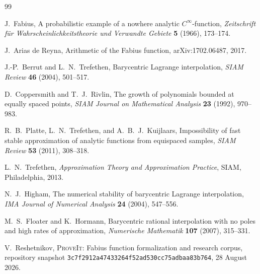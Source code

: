 \documentclass[11pt,oneside]{article}
\numberwithin{equation}{section}
\theoremstyle{definition}
\theoremstyle{remark}
\newcommand{\repo}{\textsc{ProveIt}}
\begin{document}
\begin{thebibliography}{99}

J.~Fabius,
\newblock A probabilistic example of a nowhere analytic $C^\infty$-function,
\newblock \emph{Zeitschrift f\"ur Wahrscheinlichkeitstheorie und Verwandte Gebiete}
\textbf{5} (1966), 173--174.

J.~Arias de Reyna,
\newblock Arithmetic of the Fabius function,
\newblock arXiv:1702.06487, 2017.

J.-P.~Berrut and L.~N.~Trefethen,
\newblock Barycentric Lagrange interpolation,
\newblock \emph{SIAM Review} \textbf{46} (2004), 501--517.

D.~Coppersmith and T.~J.~Rivlin,
\newblock The growth of polynomials bounded at equally spaced points,
\newblock \emph{SIAM Journal on Mathematical Analysis} \textbf{23} (1992), 970--983.

R.~B.~Platte, L.~N.~Trefethen, and A.~B.~J.~Kuijlaars,
\newblock Impossibility of fast stable approximation of analytic functions from equispaced
samples,
\newblock \emph{SIAM Review} \textbf{53} (2011), 308--318.

L.~N.~Trefethen,
\newblock \emph{Approximation Theory and Approximation Practice},
\newblock SIAM, Philadelphia, 2013.

N.~J.~Higham,
\newblock The numerical stability of barycentric Lagrange interpolation,
\newblock \emph{IMA Journal of Numerical Analysis} \textbf{24} (2004), 547--556.

M.~S.~Floater and K.~Hormann,
\newblock Barycentric rational interpolation with no poles and high rates of approximation,
\newblock \emph{Numerische Mathematik} \textbf{107} (2007), 315--331.

V.~Reshetnikov,
\newblock \repo{}: Fabius function formalization and research corpus,
\newblock repository snapshot \texttt{3c7f2912a47433264f52ad530cc75adbaa83b764},
28 August 2026.

\end{thebibliography}
\end{document}

